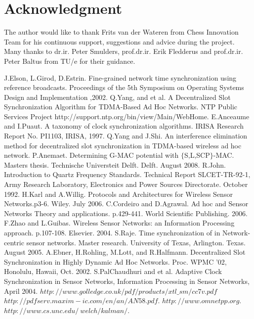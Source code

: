 \documentclass[journal]{IEEEtran}
\begin{document}
\section{\textbf{Acknowledgment}}\noindent The author would like to thank Frits van der Wateren from Chess Innovation Team for his continuous support, suggestions and advice during the project. Many thanks to dr.ir. Peter Smulders, prof.dr.ir. Erik Fledderus and prof.dr.ir. Peter Baltus from TU/e for their guidance.
\begin{thebibliography}{\textbf{References}}
J.Elson, L.Girod, D.Estrin. Fine-grained network time synchronization using reference broadcasts. Proceedings of the 5th Symposium on Operating Systems Design and Implementation ,2002.
Q.Yang, and et al. A Decentralized Slot Synchronization Algorithm for TDMA-Based Ad Hoc Networks.
NTP Public Services Project http://support.ntp.org/bin/view/Main/WebHome.
E.Anceaume and I.Puaut. A taxonomy of clock synchronization algorithms. IRISA Research Report No. PI1103, IRISA, 1997.
Q.Yang and J.Shi. An interference elimination method for decentralized slot synchronization in TDMA-based wireless ad hoc network.
 P.Anemaet. Determining G-MAC potential with $\{$S,L,SCP$\}$-MAC. Masters thesis. Technische Universteit Delft. Delft. August 2008.
R.John. Introduction to Quartz Frequency Standards. Technical Report SLCET-TR-92-1, Army Research Laboratory, Electronics and Power Sources Directorate. October 1992.
H.Karl and A.Willig. Protocols and Architectures for Wireless Sensor Networks.p3-6. Wiley. July 2006.
C.Cordeiro and D.Agrawal. Ad hoc and Sensor Networks Theory and applications. p.429-441. World Scientific Publishing. 2006.
F.Zhao and  L.Guibas. Wireless Sensor Networks: an Information Processing approach. p.107-108. Elsevier. 2004.
 S.Raje. Time synchronization of in Network-centric sensor networks. Master research. University of Texas, Arlington. Texas. August 2005.
A.Ebner, H.Rohling, M.Lott, and R.Halfmann. Decentralized Slot Synchronization in Highly Dynamic Ad Hoc Networks. Proc. WPMC '02, Honolulu, Hawaii, Oct. 2002.
S.PalChaudhuri and et al. Adaptive Clock Synchronization in Sensor Networks, Information Processing in Sensor Networks, April 2004.
 $http://www.golledge.co.uk/pdf/products/xtl\_sm/cc7v.pdf$
 $http://pdfserv.maxim-ic.com/en/an/AN58.pdf$.
$http://www.omnetpp.org$.
$http://www.cs.unc.edu/~welch/kalman/$.
\end{thebibliography}
\end{document}
